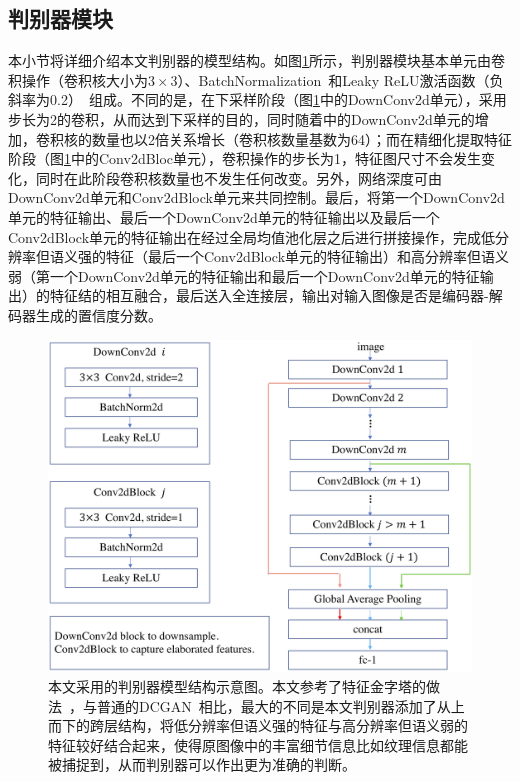 \subsection{判别器模块}\label{subsec:discrimintor_model}
本小节将详细介绍本文判别器的模型结构。如图\ref{fig:discrimintor_architecture}所示，判别器模块基本单元由卷积操作（卷积核大小为$3\times 3$）、BatchNormalization~\cite{ioffe2015batch}和Leaky ReLU激活函数（负斜率为0.2）~\cite{maas2013rectifier}组成。不同的是，在下采样阶段（图\ref{fig:discrimintor_architecture}中的DownConv2d单元），采用步长为2的卷积，从而达到下采样的目的，同时随着中的DownConv2d单元的增加，卷积核的数量也以2倍关系增长（卷积核数量基数为64）；而在精细化提取特征阶段（图\ref{fig:discrimintor_architecture}中的Conv2dBloc单元），卷积操作的步长为1，特征图尺寸不会发生变化，同时在此阶段卷积核数量也不发生任何改变。另外，网络深度可由DownConv2d单元和Conv2dBlock单元来共同控制。最后，将第一个DownConv2d单元的特征输出、最后一个DownConv2d单元的特征输出以及最后一个Conv2dBlock单元的特征输出在经过全局均值池化层之后进行拼接操作，完成低分辨率但语义强的特征（最后一个Conv2dBlock单元的特征输出）和高分辨率但语义弱（第一个DownConv2d单元的特征输出和最后一个DownConv2d单元的特征输出）的特征结的相互融合，最后送入全连接层，输出对输入图像是否是编码器-解码器生成的置信度分数。

\begin{figure}[h]
	\centering
	\includegraphics[width=1.0\textwidth]{figure/discrimintor_architecture.png}
	\caption{本文采用的判别器模型结构示意图。本文参考了特征金字塔的做法~\cite{lin2017feature}，与普通的DCGAN~\cite{radford2015unsupervised}相比，最大的不同是本文判别器添加了从上而下的跨层结构，将低分辨率但语义强的特征与高分辨率但语义弱的特征较好结合起来，使得原图像中的丰富细节信息比如纹理信息都能被捕捉到，从而判别器可以作出更为准确的判断。}
	\label{fig:discrimintor_architecture}
\end{figure}

